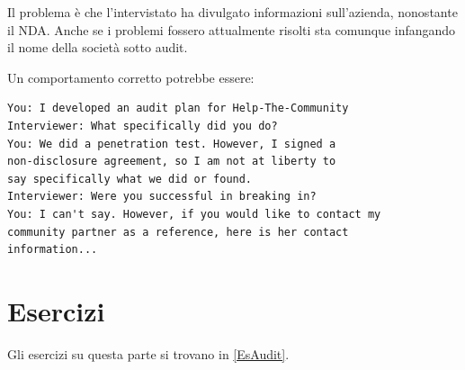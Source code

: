 Il problema è che l'intervistato ha divulgato informazioni sull'azienda,
nonostante il NDA. Anche se i problemi fossero attualmente risolti sta comunque
infangando il nome della società sotto audit.


Un comportamento corretto potrebbe essere:
\begin{verbatim}
You: I developed an audit plan for Help-The-Community
Interviewer: What specifically did you do?
You: We did a penetration test. However, I signed a
non-disclosure agreement, so I am not at liberty to
say specifically what we did or found.
Interviewer: Were you successful in breaking in?
You: I can't say. However, if you would like to contact my
community partner as a reference, here is her contact
information...
\end{verbatim}

\section{Esercizi}
Gli esercizi su questa parte si trovano in \ref{EsAudit}.
















